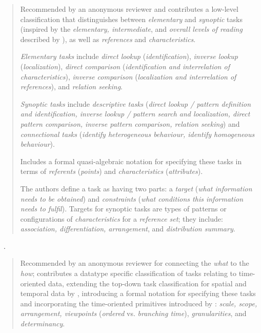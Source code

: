 \begin{quotation}
    Recommended by an anonymous reviewer and contributes a low-level classification that distinguishes between {\it elementary} and {\it synoptic} tasks (inspired by the {\it  elementary, intermediate}, and {\it overall levels of reading} described by \citet{Bertin2011}), as well as {\it references} and {\it characteristics}.
    
    {\it Elementary tasks} include {\it direct lookup} ({\it identification}), {\it inverse lookup} ({\it localization}), {\it direct comparison} ({\it identification and interrelation of characteristics}), {\it inverse comparison} ({\it localization and interrelation of references}), and {\it relation seeking}. 
    
    {\it Synoptic tasks} include {\it descriptive tasks} ({\it direct lookup / pattern definition and identification, inverse lookup / pattern search and localization, direct pattern comparison, inverse pattern comparison, relation seeking}) and {\it connectional tasks} ({\it identify heterogeneous behaviour, identify homogeneous behaviour}).
    
    \begin{sloppypar}
    Includes a formal quasi-algebraic notation for specifying these tasks in terms of {\it referents} ({\it points}) and {\it characteristics} ({\it attributes}).
    \end{sloppypar}
    
    The authors define a task as having two parts: a {\it target} ({\it what information needs to be obtained}) and {\it constraints} ({\it what conditions this information needs to fulfil}). 
    Targets for synoptic tasks are types of patterns or configurations of {\it characteristics} for a {\it reference set}; they include: {\it association, differentiation, arrangement}, and {\it distribution summary}. 
\end{quotation}

\begin{sloppypar}
~\cite{Lammarsch2012}. \end{sloppypar}

\begin{quotation}
    Recommended by an anonymous reviewer for connecting the {\it what} to the {\it how}; contributes a datatype specific classification of tasks relating to time-oriented data, extending the top-down task classification for spatial and temporal data by \citet{Andrienko2006}, introducing a formal notation for specifying these tasks and incorporating the time-oriented primitives introduced by \citet{Aigner2011}: {\it scale, scope, arrangement, viewpoints} ({\it ordered} vs. {\it branching time}), {\it granularities}, and {\it determinancy}.
\end{quotation}


